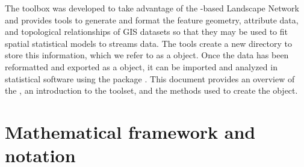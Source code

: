 \documentclass[article]{jss}
\begin{document}
The  toolbox was developed to take advantage of the
-based Landscape Network  and provides tools to generate and format
the feature geometry, attribute data, and topological relationships of
GIS datasets so that they may be used to fit spatial statistical
models to streams data. The  tools create a new directory
to store this information, which we refer to as a 
object. Once the data has been reformatted and exported as a
 object, it can be imported and analyzed in 
statistical software \citep{R:Deve:Core:ALan:2010} using the
 package \citep{Ver:Pete:Clif:Shah:SSN:2012}. This document
provides an overview of the , an introduction to the  toolset, and
the methods used to create the  object.

%
%

\section{Mathematical framework and notation}
\end{document}
